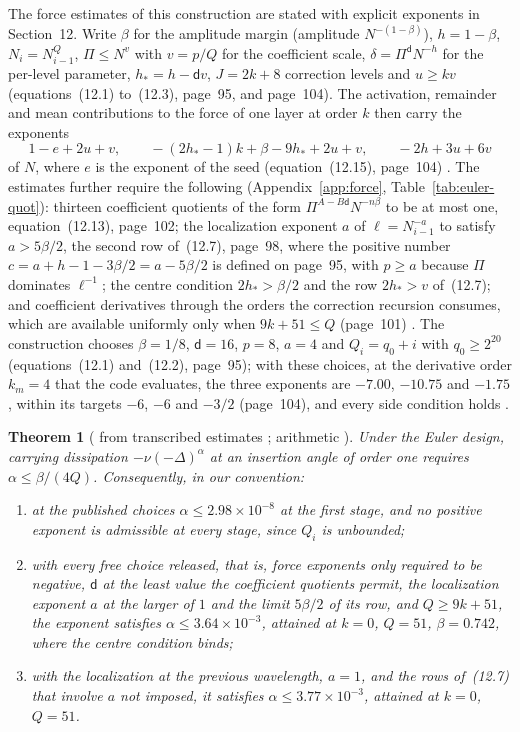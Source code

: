 \documentclass[11pt]{article}
\newtheorem{theorem}{Theorem}[section]
\theoremstyle{remark}
\newcommand{\ev}[1]{\hspace{0.2em}{\small\textsf{[#1]}}}
\begin{document}
The force estimates of this construction are stated with explicit exponents in Section~12. Write
$\beta$ for the amplitude margin (amplitude $N^{-(1-\beta)}$), $h=1-\beta$, $N_{i}=N_{i-1}^{Q}$,
$\Pi\le N^{v}$ with $v=p/Q$ for the coefficient scale, $\delta=\Pi^{\mathsf d}N^{-h}$ for the
per-level parameter, $h_{*}=h-\mathsf dv$, $J=2k+8$ correction levels and $u\ge kv$ (equations~(12.1)
to~(12.3), page~95, and page~104). The activation, remainder and mean contributions to the force of
one layer at order $k$ then carry the exponents
\begin{equation}\label{eq:euler-exp}
1-e+2u+v,\qquad -(2h_{*}-1)k+\beta-9h_{*}+2u+v,\qquad -2h+3u+6v
\end{equation}
of $N$, where $e$ is the exponent of the seed (equation~(12.15), page~104) \ev{V}. The estimates
further require the following (Appendix~\ref{app:force}, Table~\ref{tab:euler-quot}):
thirteen coefficient quotients of the form $\Pi^{A-B\mathsf d}N^{-n\beta}$ to be at most one,
equation~(12.13), page~102; the localization exponent $a$ of $\ell=N_{i-1}^{-a}$ to satisfy
$a>5\beta/2$, the second row of~(12.7), page~98, where the positive number $c=a+h-1-3\beta/2=a-5\beta/2$
is defined on page~95, with $p\ge a$ because $\Pi$ dominates $\ell^{-1}$; the centre condition
$2h_{*}>\beta/2$ and the row $2h_{*}>v$ of~(12.7); and coefficient derivatives through the orders the
correction recursion consumes, which are available uniformly only when $9k+51\le Q$ (page~101) \ev{V}.
The construction chooses $\beta=1/8$, $\mathsf d=16$, $p=8$, $a=4$ and $Q_{i}=q_{0}+i$ with
$q_{0}\ge2^{20}$ (equations~(12.1) and~(12.2), page~95); with these choices, at the derivative order $k_{m}=4$ that the code evaluates, the three exponents are
$-7.00$, $-10.75$ and $-1.75$, within its targets $-6$, $-6$ and $-3/2$ (page~104), and every side
condition holds \ev{MV}.

\begin{theorem}[\ev{D} from transcribed estimates \ev{V}; arithmetic \ev{MV}]\label{thm:euler}
Under the Euler design, carrying dissipation $-\nu(-\Delta)^{\alpha}$ at an insertion angle of order
one requires $\alpha\le\beta/(4Q)$. Consequently, in our convention:
\begin{enumerate}
\item[(i)] at the published choices $\alpha\le2.98\times10^{-8}$ at the first stage, and no positive
exponent is admissible at every stage, since $Q_{i}$ is unbounded;
\item[(ii)] with every free choice released, that is, force exponents only required to be negative,
$\mathsf d$ at the least value the coefficient quotients permit, the localization exponent $a$ at the
larger of $1$ and the limit $5\beta/2$ of its row, and $Q\ge9k+51$, the exponent
satisfies $\alpha\le3.64\times10^{-3}$, attained at $k=0$, $Q=51$, $\beta=0.742$, where the centre
condition binds;
\item[(iii)] with the localization at the previous wavelength, $a=1$, and the rows of~(12.7) that
involve $a$ not imposed, it satisfies $\alpha\le3.77\times10^{-3}$, attained at $k=0$, $Q=51$.
\end{enumerate}
\end{theorem}
\end{document}
